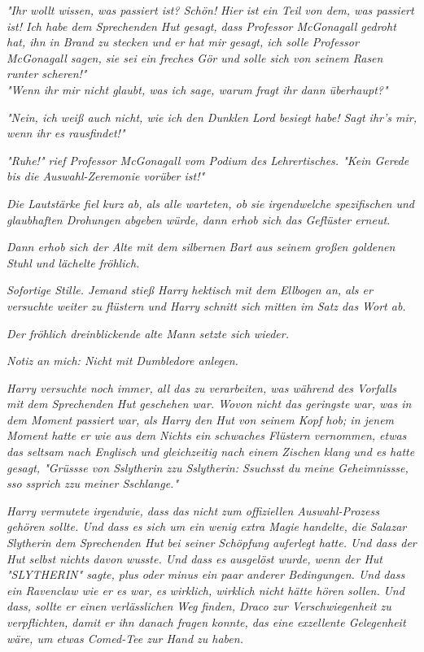 {\emph{"Ihr wollt wissen, was passiert ist? Schön!} \emph{Hier} \emph{ist ein Teil von dem, was passiert ist! Ich habe dem Sprechenden Hut gesagt, dass Professor McGonagall gedroht hat, ihn in Brand zu stecken und er hat mir gesagt, ich solle Professor McGonagall sagen, sie sei ein freches Gör und solle sich von seinem Rasen runter scheren!"}\\ \emph{"Wenn ihr mir nicht glaubt, was ich sage, warum} \emph{\emph{fragt ihr dann überhaupt?}"}

\emph{"Nein, ich weiß auch nicht, wie ich den Dunklen Lord besiegt habe! Sagt ihr's mir, wenn ihr es rausfindet!"}

\emph{"\emph{Ruhe!}" rief Professor McGonagall vom Podium des Lehrertisches. "\emph{Kein Gerede bis die Auswahl-Zeremonie vorüber ist!}"}

\emph{Die Lautstärke fiel kurz ab, als alle warteten, ob sie irgendwelche spezifischen und glaubhaften Drohungen abgeben würde, dann erhob sich das Geflüster erneut.}

\emph{Dann erhob sich der Alte mit dem silbernen Bart aus seinem großen goldenen Stuhl und lächelte fröhlich.}

\emph{Sofortige Stille. Jemand stieß Harry hektisch mit dem Ellbogen an, als er versuchte weiter zu flüstern und Harry schnitt sich mitten im Satz das Wort ab.}

\emph{Der fröhlich dreinblickende alte Mann setzte sich wieder.}

\emph{\emph{Notiz an mich: Nicht mit Dumbledore anlegen.}}

\emph{Harry versuchte noch immer, all das zu verarbeiten, was während des Vorfalls mit dem Sprechenden Hut geschehen war. Wovon nicht das geringste war, was in dem Moment passiert war, als Harry den Hut von seinem Kopf hob; in jenem Moment hatte er wie aus dem Nichts ein schwaches Flüstern vernommen, etwas das seltsam nach Englisch und gleichzeitig nach einem Zischen klang und es hatte gesagt, "\emph{Grüssse von Sslytherin zzu Sslytherin: Ssuchsst du meine Geheimnissse, sso s}\emph{s}\emph{prich zzu meiner Sschlange.}"}

\emph{Harry vermutete irgendwie, dass das nicht zum offiziellen Auswahl-Prozess} \emph{gehören sollte. Und dass es sich um ein wenig extra Magie handelte, die Salazar Slytherin dem Sprechenden Hut} \emph{bei seiner Schöpfung} \emph{auferlegt hatte. Und dass der Hut selbst nichts davon wusste. Und dass es ausgelöst wurde, wenn der Hut "SLYTHERIN" sagte, plus oder minus ein paar anderer Bedingungen. Und dass ein Ravenclaw wie er es war, es} \emph{\emph{wirklich, wirklich nicht hätte hören sollen.}} \emph{Und dass, sollte er einen verlässlichen Weg finden, Draco zur Verschwiegenheit zu verpflichten, damit er ihn danach fragen konnte, das eine exzellente Gelegenheit wäre, um etwas Comed-Tee zur Hand zu haben.}

}
